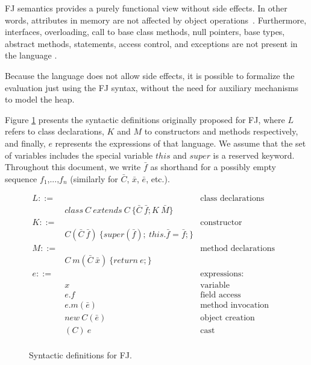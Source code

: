 \documentclass[tese,capa,english]{texufpel}
\begin{document}
FJ semantics provides a purely functional view without side effects. In other words, attributes in memory are not affected by object operations~\cite{Pierce:2002:TPL:509043}. Furthermore, interfaces, overloading, call to base class methods, null pointers, base types, abstract methods, statements, access control, and exceptions are not present in the language \cite{Igarashi:2001:FJM:503502.503505}. 

Because the language does not allow side effects, it is possible to formalize the evaluation just using the FJ syntax, without the need for auxiliary mechanisms to model the heap. 

Figure \ref{fig:fj-syntax} presents the syntactic definitions originally proposed for FJ, where $L$ refers to class declarations, $K$ and $M$ to constructors and methods respectively, and finally, $e$ represents the expressions of that language. We assume that the set of variables includes the special variable $this$ and $super$ is a reserved keyword. Throughout this document, we write $\bar{f}$ as shorthand for a possibly empty sequence $f_1$,...,$f_n$ (similarly for $\bar{C}$, $\bar{x}$, $\bar{e}$, etc.). 

\begin{figure}[!htb]
\[
\begin{array}{llr}
  L ::= & \ \ \ \ \ \ \ \ \ \ \ \ \ \ \ \ \ \ \ \ \ \ \ \ \ \ \ \ \ \ \ \ \ \ \ \ \ \ & \textrm{class declarations} \\
        & class \ C \ extends \ C \ \{ \bar{C} \ \bar{f}; K \ \bar{M} \} & \\
  K ::= & & \textrm{constructor declarations} \\
        & C(\bar{C} \ \bar{f}) \ \{ super(\bar{f}); \ this.\bar{f}=\bar{f}; \} & \\
  M ::= & & \textrm{method declarations} \\
        & C \ m(\bar{C} \ \bar{x}) \ \{ return \ e; \} & \\
  e ::= & & \textrm{expressions: } \\
        & x & \textrm{variable} \\
        & e.f & \textrm{field access} \\
        & e.m(\bar{e}) & \textrm{method invocation} \\
        & new \ C(\bar{e}) & \textrm{object creation} \\
        & (C) \ e & \textrm{cast} \\
\end{array}
\]
\caption{Syntactic definitions for FJ.}
\label{fig:fj-syntax}
\end{figure}
\end{document}
